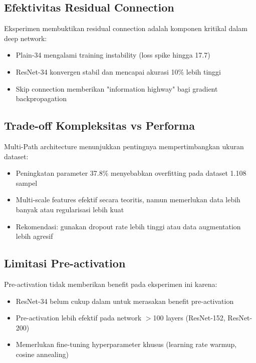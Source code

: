 \documentclass[11pt,a4paper]{article}
\begin{document}
\subsection{Efektivitas Residual Connection}
Eksperimen membuktikan residual connection adalah komponen kritikal dalam deep network:
\begin{itemize}
    \item Plain-34 mengalami training instability (loss spike hingga 17.7)
    \item ResNet-34 konvergen stabil dan mencapai akurasi 10\% lebih tinggi
    \item Skip connection memberikan "information highway" bagi gradient backpropagation
\end{itemize}

\subsection{Trade-off Kompleksitas vs Performa}
Multi-Path architecture menunjukkan pentingnya mempertimbangkan ukuran dataset:
\begin{itemize}
    \item Peningkatan parameter 37.8\% menyebabkan overfitting pada dataset 1.108 sampel
    \item Multi-scale features efektif secara teoritis, namun memerlukan data lebih banyak atau regularisasi lebih kuat
    \item Rekomendasi: gunakan dropout rate lebih tinggi atau data augmentation lebih agresif
\end{itemize}

\subsection{Limitasi Pre-activation}
Pre-activation tidak memberikan benefit pada eksperimen ini karena:
\begin{itemize}
    \item ResNet-34 belum cukup dalam untuk merasakan benefit pre-activation
    \item Pre-activation lebih efektif pada network $>$100 layers (ResNet-152, ResNet-200)
    \item Memerlukan fine-tuning hyperparameter khusus (learning rate warmup, cosine annealing)
\end{itemize}
\end{document}
